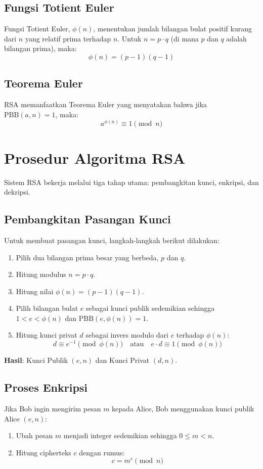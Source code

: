 \documentclass[../main.tex]{subfiles}
\begin{document}
\subsection{Fungsi Totient Euler}
Fungsi Totient Euler, $\phi(n)$, menentukan jumlah bilangan bulat positif kurang dari $n$ yang relatif prima terhadap $n$. Untuk $n = p \cdot q$ (di mana $p$ dan $q$ adalah bilangan prima), maka:
\[ \phi(n) = (p - 1)(q - 1) \]

\subsection{Teorema Euler}
RSA memanfaatkan Teorema Euler yang menyatakan bahwa jika $\text{PBB}(a, n) = 1$, maka:
\[ a^{\phi(n)} \equiv 1 \pmod{n} \]

\section{Prosedur Algoritma RSA}
Sistem RSA bekerja melalui tiga tahap utama: pembangkitan kunci, enkripsi, dan dekripsi.

\subsection{Pembangkitan Pasangan Kunci}
Untuk membuat pasangan kunci, langkah-langkah berikut dilakukan:
\begin{enumerate}
    \item Pilih dua bilangan prima besar yang berbeda, $p$ dan $q$.
    \item Hitung modulus $n = p \cdot q$.
    \item Hitung nilai $\phi(n) = (p - 1)(q - 1)$.
    \item Pilih bilangan bulat $e$ sebagai kunci publik sedemikian sehingga $1 < e < \phi(n)$ dan $\text{PBB}(e, \phi(n)) = 1$.
    \item Hitung kunci privat $d$ sebagai invers modulo dari $e$ terhadap $\phi(n)$:
    \[ d \equiv e^{-1} \pmod{\phi(n)} \quad \text{atau} \quad e \cdot d \equiv 1 \pmod{\phi(n)} \]
\end{enumerate}
\textbf{Hasil}: Kunci Publik $(e, n)$ dan Kunci Privat $(d, n)$.

\subsection{Proses Enkripsi}
Jika Bob ingin mengirim pesan $m$ kepada Alice, Bob menggunakan kunci publik Alice $(e, n)$:
\begin{enumerate}
    \item Ubah pesan $m$ menjadi integer sedemikian sehingga $0 \le m < n$.
    \item Hitung cipherteks $c$ dengan rumus:
    \[ c = m^e \pmod{n} \]
\end{enumerate}
\end{document}
